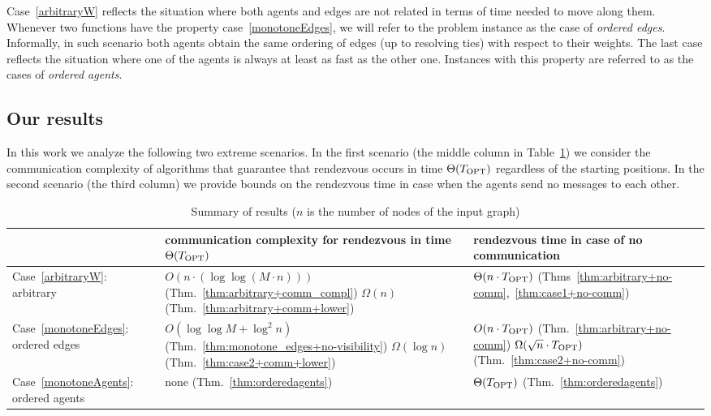 \documentclass{llncs}
\newcommand{\Topts}{T_{\scriptsize \textup{OPT}}}
\begin{document}
Case~\ref{arbitraryW} reflects the situation where both agents and edges are not related in terms of time needed to move along them. 
Whenever two functions have the property case~\ref{monotoneEdges}, we will refer to the problem instance as the case of \emph{ordered edges}.
Informally, in such scenario both agents obtain the same ordering of edges (up to resolving ties) with respect to their weights.
The last case reflects the situation where one of the agents is always at least as fast as the other one.
Instances with this property are referred to as the cases of \emph{ordered agents}.

\subsection{Our results}

In this work we analyze the following two extreme scenarios.
In the first scenario (the middle column in Table~\ref{tab:summary}) we consider the communication complexity of algorithms that guarantee that rendezvous occurs in time $\Theta(\Topts)$ regardless of the starting positions.
In the second scenario (the third column) we provide bounds on the rendezvous time in case when the agents send no messages to each other.

\begin{table}[htb]
\begin{center}
\caption{Summary of results ($n$ is the number of nodes of the input graph)}\label{tab:summary}
\begin{tabular}{|p{3.25cm}||p{4.75cm}|p{3.5cm}|} \hline
& communication complexity for \newline
	rendezvous in time $\Theta(\Topts)$
& rendezvous time in case  \newline
 of no communication \\ \hline\hline

Case~\ref{arbitraryW}: arbitrary &
$O(n \cdot (\log \log (M \cdot n)))$ (Thm.~\ref{thm:arbitrary+comm_compl}) \newline
$\Omega(n)$ (Thm.~\ref{thm:arbitrary+comm+lower})
 &
$\Theta(n\cdot\Topts)$ (Thms~\ref{thm:arbitrary+no-comm},~\ref{thm:case1+no-comm})

\\ \hline

Case~\ref{monotoneEdges}: ordered edges &
$O(\log\log M+\log^2n)$ (Thm.~\ref{thm:monotone_edges+no-visibility}) \newline
$\Omega(\log n)$ (Thm.~\ref{thm:case2+comm+lower})
&
$O(n\cdot\Topts)$ (Thm.~\ref{thm:arbitrary+no-comm}) \newline
$\Omega(\sqrt{n}\cdot\Topts)$ (Thm.~\ref{thm:case2+no-comm})
\\  \hline

Case~\ref{monotoneAgents}: ordered agents
&  none (Thm.~\ref{thm:orderedagents})
& $\Theta(\Topts)$ (Thm.~\ref{thm:orderedagents}) \\ \hline
\end{tabular}
\end{center}
\end{table}
\end{document}

